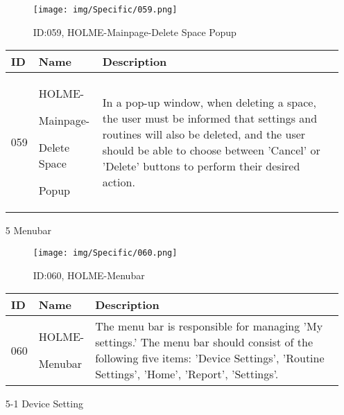 \documentclass[conference]{IEEEtran}
\begin{document}
\begin{enumerate}
\begin{figure}[h]
\centering
\texttt{[image: img/Specific/059.png]}
\caption{ID:059, HOLME-Mainpage-Delete Space Popup}
\end{figure}
\begin{table}[h]
\def\arraystretch{1.2} \small
    \begin{tabular}{|p{1cm}|p{1.8cm}|p{5.0cm}|}
        \hline
        ID & Name & Description\\ \hline
         059 \par  & HOLME-\par Mainpage-\par Delete Space\par Popup  &In a pop-up window, when deleting a space, the user must be informed that settings and routines will also be deleted, and the user should be able to choose between 'Cancel' or 'Delete' buttons to perform their desired action.\\ \hline
    \end{tabular}
\end{table}

\vspace{6cm}

\item[5] Menubar\\
\begin{figure}[h]
\centering
\texttt{[image: img/Specific/060.png]}
\caption{ID:060, HOLME-Menubar}
\end{figure}
\begin{table}[h]
\def\arraystretch{1.2} \small
    \begin{tabular}{|p{1cm}|p{1.8cm}|p{5.0cm}|}
        \hline
        ID & Name & Description\\ \hline
         060 \par  & HOLME-\par Menubar  &The menu bar is responsible for managing 'My settings.' The menu bar should consist of the following five items: 'Device Settings', 'Routine Settings', 'Home', 'Report', 'Settings'.\\ \hline
    \end{tabular}
\end{table}

\item[5-1] Device Setting\\


\end{enumerate}
\end{document}
